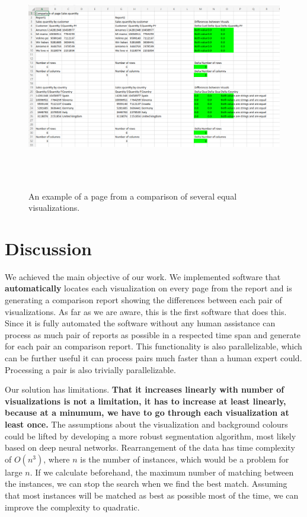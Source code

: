\documentclass[fleqn,moreauthors,10pt]{ds_report}
\begin{document}
\begin{figure}
      \centering
    \includegraphics[width=\linewidth, height=10cm]{fig/best_report.png}
    \caption{An example of a page from a comparison of several equal visualizations.}
    \label{fig:report2}  
\end{figure}

\section*{Discussion}
We achieved the main objective of our work. We implemented software that \textbf{automatically} locates each visualization on every page from the report and is generating a comparison report showing the differences between each pair of visualizations. As far as we are aware, this is the first software that does this. Since it is fully automated the software without any human assistance can process as much pair of reports as possible in a respected time span and generate for each pair an comparison report. This functionality is also parallelizable, which can be further useful it can process pairs much faster than a human expert could. Processing a pair is also trivially parallelizable.
\par

Our solution has limitations. \textbf{That it increases linearly with number of visualizations is not a limitation, it has to increase at least linearly, because at a minumum, we have to go through each visualization at least once.} The assumptions about the visualization and background colours could be lifted by developing a more robust segmentation algorithm, most likely based on deep neural networks. Rearrangement of the data has time complexity of $O(n^3)$, where $n$ is the number of instances, which would be a problem for large $n$. If we calculate beforehand, the maximum number of matching between the instances, we can stop the search when we find the best match. Assuming that most  instances will be matched as best as possible most of the time,  we can improve the complexity to quadratic.
\end{document}

